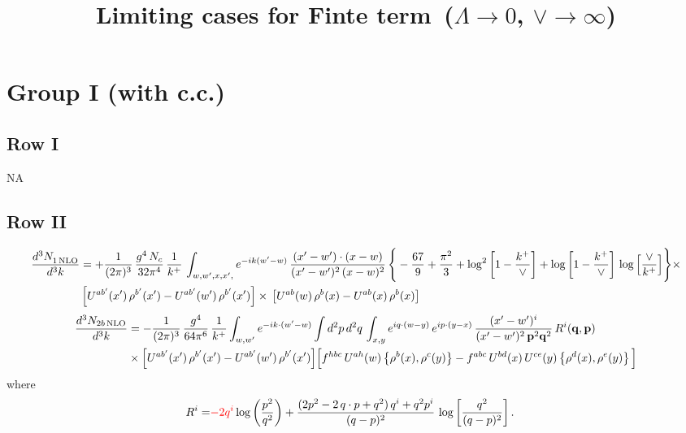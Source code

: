 \documentclass[9pt]{article}
\title{Limiting cases for Finte term\, ($\Lambda\to 0$, $\vee\to \infty$)}
\author{}
\date{}
\numberwithin{equation}{section}
\newcommand{\chg}[1]{{\color{red}#1}}
\begin{document}
\maketitle
\section{Group I (with c.c.)}
\subsection{Row I}
\textsc{NA}
\subsection{Row II}
\begin{align}
     \frac{d^{3}N_{1\,\rm NLO}^{\rm}}{d^{3}k} &  =  +\frac{1}{(2\pi)^{3}}\, \frac{g^{4}\,N_{c}}{32\pi^{4}}\,\frac{1}{k^{+}}\, \int_{w, w',x,x',} e^{-ik(w^\prime-w)}\, \frac{(x'-w')\cdot (x-w)}{(x'-w')^{2}\, (x-w)^{2}}\, \Bigg\{ -\frac{67}{9}+\frac{\pi^{2}}{3}+\log^{2}{\left[1-\frac{k^{+}}{\vee}\right]}+\log{\left[1-\frac{k^{+}}{\vee}\right]}\,\log{\left[\frac{\vee}{k^{+}}\right]}\Bigg\}\times\notag \\ & \left[U^{ab'}(x')\,\rho^{b'}(x') - U^{ab'}(w')\,\rho^{b'}(x')\right]\times\,\left[U^{ab}(w)\,\rho^{b}(x) - U^{ab}(x)\,\rho^{b}(x)\right]
\end{align}  
\begin{align}
\frac{d^{3}N_{2b\,\rm NLO}}{d^{3}k} & = -\frac{1}{(2\pi)^{3}}\,\frac{g^{4}}{64\pi^{6}}\,\frac{1}{k^{+}}\int_{w,w'} e^{-ik\cdot(w'-w)}
\int d^{2}p\,d^{2}q\,\int_{x,y} e^{iq\cdot(w-y)}\,e^{ip\cdot(y-x)}\,\frac{(x'-w')^{i}}{(x'-w')^{2}\,\mathbf{p}^{2}\mathbf{q}^{2}}\,R^{i}(\mathbf{q},\mathbf{p})\notag\\ &\times\Big[U^{ab'}(x')\,\rho^{b'}(x')-U^{ab'}(w')\,\rho^{b'}(x')\Big]
\Big[f^{hbc}\,U^{ah}(w)\left\{\rho^{b}(x),\rho^{c}(y)\right\}-f^{abc}\,U^{bd}(x)\,U^{ce}(y)\left\{\rho^{d}(x),\rho^{e}(y)\right\}\Big]
\end{align}
where
\begin{align}
R^{i} =& \chg{-2q^{i}}\log\left(\frac{p^{2}}{q^{2}}\right)
+\frac{(2p^{2}-2\,q\cdot p+q^{2})\,q^{i}+q^{2}p^{i}}{(q-p)^{2}}\,
\log\left[\frac{q^{2}}{(q-p)^{2}}\right].
\end{align}
\end{document}
